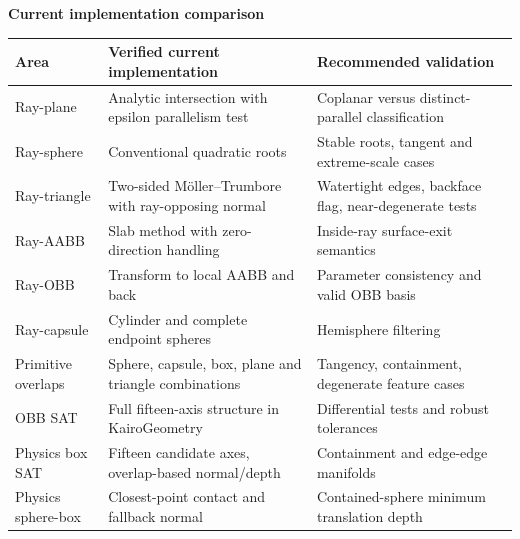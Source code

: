 \hypertarget{04-visual-computing-ii-ch025-part-ix-actual-kairogeometry-and-kairophysicsengine-review}{}

\textbf{Current implementation comparison}

{\def\LTcaptype{none} %
\begin{longtable}[]{@{}
  >{\raggedright\arraybackslash}p{}
  >{\raggedright\arraybackslash}p{}
  >{\raggedright\arraybackslash}p{}@{}}
\toprule\noalign{}
\begin{minipage}[b]{\linewidth}\raggedright
Area
\end{minipage} & \begin{minipage}[b]{\linewidth}\raggedright
Verified current implementation
\end{minipage} & \begin{minipage}[b]{\linewidth}\raggedright
Recommended validation
\end{minipage} \\
\midrule\noalign{}
\endhead
\bottomrule\noalign{}
\endlastfoot
Ray-plane & Analytic intersection with epsilon parallelism test & Coplanar versus distinct-parallel classification \\
Ray-sphere & Conventional quadratic roots & Stable roots, tangent and extreme-scale cases \\
Ray-triangle & Two-sided Möller--Trumbore with ray-opposing normal & Watertight edges, backface flag, near-degenerate tests \\
Ray-AABB & Slab method with zero-direction handling & Inside-ray surface-exit semantics \\
Ray-OBB & Transform to local AABB and back & Parameter consistency and valid OBB basis \\
Ray-capsule & Cylinder and complete endpoint spheres & Hemisphere filtering \\
Primitive overlaps & Sphere, capsule, box, plane and triangle combinations & Tangency, containment, degenerate feature cases \\
OBB SAT & Full fifteen-axis structure in KairoGeometry & Differential tests and robust tolerances \\
Physics box SAT & Fifteen candidate axes, overlap-based normal/depth & Containment and edge-edge manifolds \\
Physics sphere-box & Closest-point contact and fallback normal & Contained-sphere minimum translation depth \\
\end{longtable}
}

